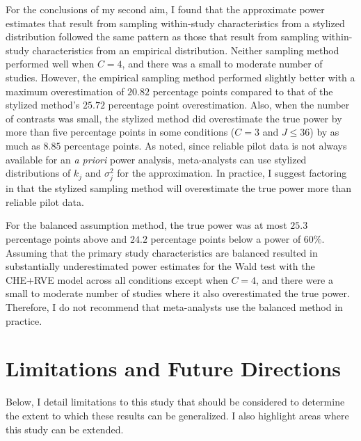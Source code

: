 For the conclusions of my second aim, I found that the approximate power estimates that result from sampling within-study characteristics from a stylized distribution followed the same pattern as those that result from sampling within-study characteristics from an empirical distribution. Neither sampling method performed well when $C=4$, and there was a small to moderate number of studies. However, the empirical sampling method performed slightly better with a maximum overestimation of $20.82$ percentage points compared to that of the stylized method's $25.72$ percentage point overestimation. Also, when the number of contrasts was small, the stylized method did overestimate the true power by more than five percentage points in some conditions ($C = 3$ and $J \leq 36$) by as much as $8.85$ percentage points. As \textcite{vembye2023} noted, since reliable pilot data is not always available for an \textit{a priori} power analysis, meta-analysts can use stylized distributions of $k_j$ and $\sigma_j^2$ for the approximation. In practice, I suggest factoring in that the stylized sampling method will overestimate the true power more than reliable pilot data. 

For the balanced assumption method, the true power was at most $25.3$ percentage points above and $24.2$ percentage points below a power of $60\%$. Assuming that the primary study characteristics are balanced resulted in substantially underestimated power estimates for the Wald test with the CHE+RVE model across all conditions except when $C=4$, and there were a small to moderate number of studies where it also overestimated the true power. Therefore, I do not recommend that meta-analysts use the balanced method in practice. 


\section{Limitations and Future Directions}

Below, I detail limitations to this study that should be considered to determine the extent to which these results can be generalized. I also highlight areas where this study can be extended. 

